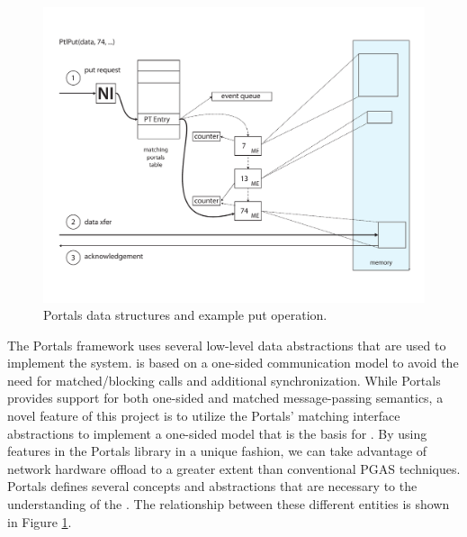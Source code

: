 



\begin{figure}[ht]
  \centering
  \includegraphics[scale=.35]{figs/portals_put}
  \caption{Portals data structures and example put operation.}
  \label{fig:portals_put}
\end{figure}


The Portals framework uses several low-level data abstractions that
are used to implement the \pdht system. \pdht is based on a one-sided
communication model to avoid the need for matched/blocking calls and
additional synchronization. While Portals provides support for both
one-sided and matched message-passing semantics, a novel feature of
this project is to utilize the Portals' matching interface
abstractions to implement a one-sided model that is the basis for
\pdht. By using features in the Portals library in a unique fashion,
we can take advantage of network hardware offload  to a greater extent
than conventional PGAS techniques. Portals defines several concepts
and abstractions that are necessary to the understanding of the
\pdht. The relationship between these different entities is shown in
Figure \ref{fig:portals_put}.

